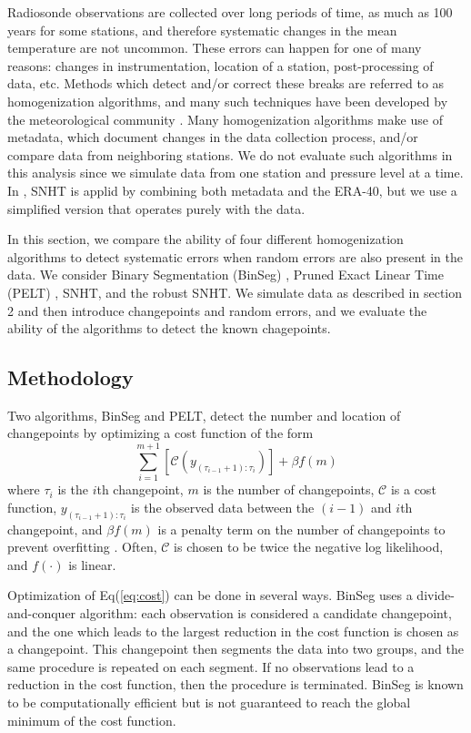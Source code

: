 \documentclass[12pt]{article}
\begin{document}
\begin{doublespacing}
Radiosonde observations are collected over long periods of time, as much as 100 years for some stations, and therefore systematic changes in the mean temperature are not uncommon.  These errors can happen for one of many reasons: changes in instrumentation, location of a station, post-processing of data, etc.  Methods which detect and/or correct these breaks are referred to as homogenization algorithms, and many such techniques have been developed by the meteorological community \cite{alexandersson86, domonkos13, gruber08, haimberger07, lanzante03, li14, lu10, venema12}.  Many homogenization algorithms make use of metadata, which document changes in the data collection process, and/or compare data from neighboring stations.  We do not evaluate such algorithms in this analysis since we simulate data from one station and pressure level at a time.  In \cite{haimberger07}, SNHT is applid by combining both metadata and the ERA-40, but we use a simplified version that operates purely with the data.

In this section, we compare the ability of four different homogenization algorithms to detect systematic errors when random errors are also present in the data.  We consider Binary Segmentation (BinSeg) \cite{scott74}, Pruned Exact Linear Time (PELT) \cite{killick12}, SNHT, and the robust SNHT.  We simulate data as described in section 2 and then introduce changepoints and random errors, and we evaluate the ability of the algorithms to detect the known chagepoints. 

\subsection{Methodology}

Two algorithms, BinSeg and PELT, detect the number and location of changepoints by optimizing a cost function of the form
\begin{equation}
	\sum_{i=1}^{m+1} [\mathcal{C}(y_{(\tau_{i-1}+1):\tau_i})] + \beta f(m)
	\label{eq:cost}
\end{equation}
where $\tau_i$ is the $i$th changepoint, $m$ is the number of changepoints, $\mathcal{C}$ is a cost function, $y_{(\tau_{i-1}+1):\tau_i}$ is the observed data between the $(i-1)$ and $i$th changepoint, and $\beta f(m)$ is a penalty term on the number of changepoints to prevent overfitting \cite{killick12}.  Often, $\mathcal{C}$ is chosen to be twice the negative log likelihood, and $f(\cdot)$ is linear.

Optimization of Eq(\ref{eq:cost}) can be done in several ways.  BinSeg uses a divide-and-conquer algorithm: each observation is considered a candidate changepoint, and the one which leads to the largest reduction in the cost function is chosen as a changepoint.  This changepoint then segments the data into two groups, and the same procedure is repeated on each segment.  If no observations lead to a reduction in the cost function, then the procedure is terminated.  BinSeg is known to be computationally efficient but is not guaranteed to reach the global minimum of the cost function.


\end{doublespacing}
\end{document}
